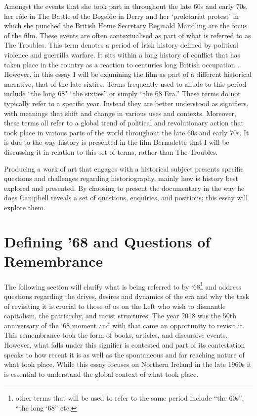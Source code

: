 \documentclass[12pt]{article}
\begin{document}
Amongst the events that she took part in throughout the late 60s and early 70s, her r\^{o}le in The Battle of the Bogside in Derry and her `proletariat protest' \cite{Bertenshaw:2016aa} in which she punched the British Home Secretary Reginald Maudling are the focus of the film. These events are often contextualised as part of what is referred to as The Troubles. This term denotes a period of Irish history defined by political violence and guerrilla warfare. It sits within a long history of conflict that has taken place in the country as a reaction to centuries long British occupation \cite{Foster:1988aa}. However, in this essay I will be examining the film as part of a different historical narrative, that of the late sixties. Terms frequently used to allude to this period include ``the long 68" ``the sixties'' or simply ``the 68 Era.'' These terms do not typically refer to a specific year. Instead they are better understood as signifiers, with meanings that shift and change in various uses and contexts. Moreover, these terms all refer to a global trend of political and revolutionary action that took place in various parts of the world throughout the late 60s and early 70s. It is due to the way history is presented in the film Bernadette that I will be discussing it in relation to this set of terms, rather than The Troubles. 

Producing a work of art that engages with a historical subject presents specific questions and challenges regarding historiography, mainly how is history best explored and presented. By choosing to present the documentary in the way he does Campbell reveals a set of questions, enquiries, and positions; this essay will explore them. 



\section{Defining '68 and Questions of Remembrance}
 
The following section will clarify what is being referred to by `68\footnote{other terms that will be used to refer to the same period include “the 60s”, “the long ‘68” etc.}  and address questions regarding the drives, desires and dynamics of the era and why the task of revisiting it is crucial to those of us on the Left who wish to dismantle capitalism, the patriarchy, and racist structures. 
The year 2018 was the 50th anniversary of the `68 moment and with that came an opportunity to revisit it. This remembrance took the form of books, articles, and discursive events. However, what falls under this signifier is contested and part of its contestation speaks to how recent it is as well as the spontaneous and far reaching nature of what took place. While this essay focuses on Northern Ireland in the late 1960s it is essential to understand the global context of what took place. 
\end{document}
